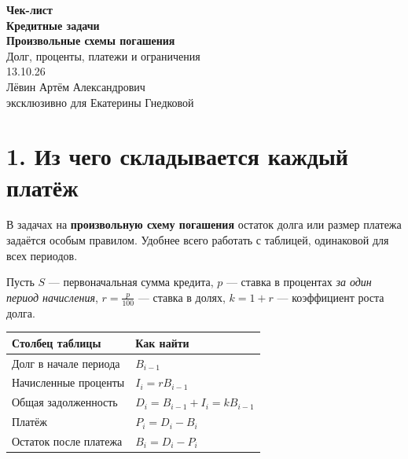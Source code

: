 \documentclass[a4paper,12pt]{article}
\newcommand{\key}[1]{\textcolor{darkaccent}{\textbf{#1}}}
\begin{document}
\thispagestyle{empty}
\begin{center}
\vspace*{30mm}
{\Large\textcolor{accent}{\textbf{Чек-лист}}}\\[10mm]
{\Huge\textbf{Кредитные задачи}}\\[7mm]
{\Large\textbf{Произвольные схемы погашения}}\\[5mm]
{\large Долг, проценты, платежи и ограничения}\\[20mm]
{\large 13.10.26}\\[29mm]
{\large Лёвин Артём Александрович}\\[4mm]
{\large\textcolor{darkaccent}{эксклюзивно для Екатерины Гнедковой}}
\end{center}
\vfill
\begin{center}
\end{center}
\clearpage

\section*{1. Из чего складывается каждый платёж}

В задачах на \key{произвольную схему погашения} остаток долга или размер платежа задаётся особым правилом. Удобнее всего работать с таблицей, одинаковой для всех периодов.

Пусть $S$ --- первоначальная сумма кредита, $p$ --- ставка в процентах \emph{за один период начисления}, $r=\frac{p}{100}$ --- ставка в долях, $k=1+r$ --- коэффициент роста долга.

\begin{center}
\renewcommand{\arraystretch}{1.3}
\begin{tabularx}{\linewidth}{@{}>{\raggedright\arraybackslash}X >{\raggedright\arraybackslash}X@{}}
\toprule
Столбец таблицы & Как найти \\
\midrule
Долг в начале периода & $B_{i-1}$ \\
Начисленные проценты & $I_i=rB_{i-1}$ \\
Общая задолженность & $D_i=B_{i-1}+I_i=kB_{i-1}$ \\
Платёж & $P_i=D_i-B_i$ \\
Остаток после платежа & $B_i=D_i-P_i$ \\
\bottomrule
\end{tabularx}
\end{center}
\end{document}
